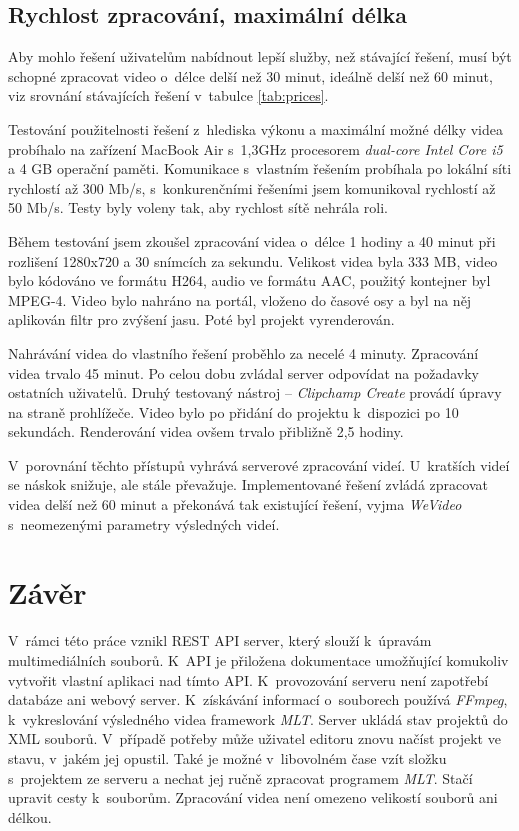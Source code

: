 \section{Rychlost zpracování, maximální délka}
Aby mohlo řešení uživatelům nabídnout lepší služby, než stávající řešení, musí být schopné zpracovat video o~délce delší než 30 minut, ideálně delší než 60 minut, viz srovnání stávajících řešení v~tabulce \ref{tab:prices}.

Testování použitelnosti řešení z~hlediska výkonu a maximální možné délky videa probíhalo na zařízení MacBook Air s~1,3GHz procesorem \textit{dual-core Intel Core i5} a 4 GB operační paměti. Komunikace s~vlastním řešením probíhala po lokální síti rychlostí až 300 Mb/s, s~konkurenčními řešeními jsem komunikoval rychlostí až 50 Mb/s. Testy byly voleny tak, aby rychlost sítě nehrála roli.

Během testování jsem zkoušel zpracování videa o~délce 1 hodiny a 40 minut při rozlišení 1280x720 a 30 snímcích za sekundu. Velikost videa byla 333 MB, video bylo kódováno ve formátu H264, audio ve formátu AAC, použitý kontejner byl MPEG-4. Video bylo nahráno na portál, vloženo do časové osy a byl na něj aplikován filtr pro zvýšení jasu. Poté byl projekt vyrenderován.

Nahrávání videa do vlastního řešení proběhlo za necelé 4 minuty. Zpracování videa trvalo 45 minut. Po celou dobu zvládal server odpovídat na požadavky ostatních uživatelů. Druhý testovaný nástroj -- \textit{Clipchamp Create} provádí úpravy na straně prohlížeče. Video bylo po přidání do projektu k~dispozici po 10 sekundách. Renderování videa ovšem trvalo přibližně 2,5 hodiny.

V~porovnání těchto přístupů vyhrává serverové zpracování videí. U~kratších videí se náskok snižuje, ale stále převažuje. Implementované řešení zvládá zpracovat videa delší než 60 minut a překonává tak existující řešení, vyjma \textit{WeVideo} s~neomezenými parametry výsledných videí.

\chapter{Závěr}
V~rámci této práce vznikl REST API server, který slouží k~úpravám multimediálních souborů. K~API je přiložena dokumentace umožňující komukoliv vytvořit vlastní aplikaci nad tímto API. K~provozování serveru není zapotřebí databáze ani webový server. K~získávání informací o~souborech používá \textit{FFmpeg}, k~vykreslování výsledného videa framework \textit{MLT}. Server ukládá stav projektů do XML souborů. V~případě potřeby může uživatel editoru znovu načíst projekt ve stavu, v~jakém jej opustil. Také je možné v~libovolném čase vzít složku s~projektem ze serveru a nechat jej ručně zpracovat programem \textit{MLT}. Stačí upravit cesty k~souborům. Zpracování videa není omezeno velikostí souborů ani délkou.

